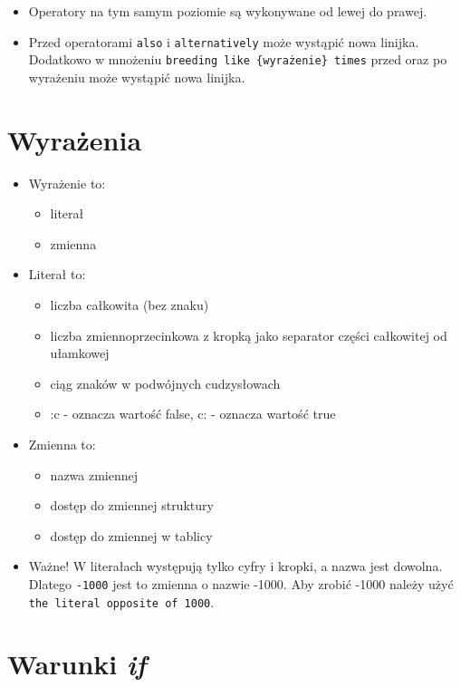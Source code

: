 \documentclass{article}
\begin{document}
\begin{itemize}
\begin{enumerate}
\end{enumerate}

\item Operatory na tym samym poziomie są wykonywane od lewej do prawej.
\item Przed operatorami \texttt{also} i \texttt{alternatively} może wystąpić nowa linijka. \\
Dodatkowo w mnożeniu \texttt{breeding like \{wyrażenie\} times} przed oraz po wyrażeniu może wystąpić nowa linijka.

\end{itemize}

\section{Wyrażenia}

\begin{itemize}
    \item Wyrażenie to:
    \begin{itemize}
        \item literał
        \item zmienna
    \end{itemize}
    \item Literał to:
    \begin{itemize}
        \item liczba całkowita (bez znaku)
        \item liczba zmiennoprzecinkowa z kropką jako separator części całkowitej od ułamkowej
        \item ciąg znaków w podwójnych cudzysłowach
        \item :c - oznacza wartość false, c: - oznacza wartość true
    \end{itemize}
    \item Zmienna to:
    \begin{itemize}
        \item nazwa zmiennej
        \item dostęp do zmiennej struktury
        \item dostęp do zmiennej w tablicy
    \end{itemize}
    \item Ważne! W literałach występują tylko cyfry i kropki, a nazwa jest dowolna. Dlatego \texttt{-1000} jest to zmienna o nazwie -1000. Aby zrobić -1000 należy użyć \texttt{the literal opposite of 1000}.
\end{itemize}
\section{Warunki \textit{if}}
\end{document}
